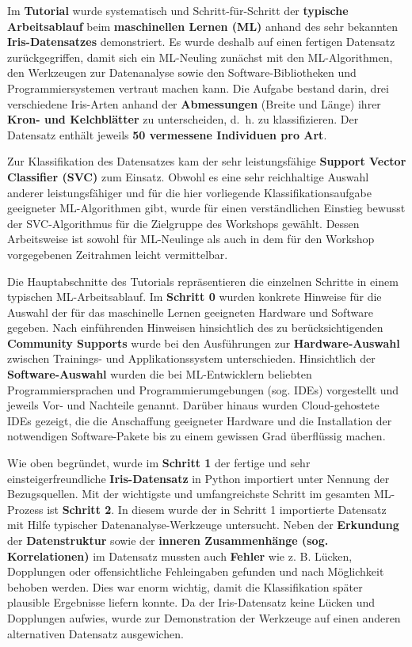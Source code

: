 \documentclass [oneside,10pt,a4paper,ngerman,BCOR10mm,headsepline,parindent,final]{scrartcl}
\begin{document}
Im \textbf{Tutorial} wurde systematisch und Schritt-für-Schritt der
\textbf{typische Arbeitsablauf} beim \textbf{maschinellen Lernen (ML)}
anhand des sehr bekannten \textbf{Iris-Datensatzes} demonstriert. Es
wurde deshalb auf einen fertigen Datensatz zurückgegriffen, damit sich
ein ML-Neuling zunächst mit den ML-Algorithmen, den Werkzeugen zur
Datenanalyse sowie den Software-Bibliotheken und Programmiersystemen
vertraut machen kann. Die Aufgabe bestand darin, drei verschiedene
Iris-Arten anhand der \textbf{Abmessungen} (Breite und Länge) ihrer
\textbf{Kron- und Kelchblätter} zu unterscheiden, d.~h. zu
klassifizieren. Der Datensatz enthält jeweils \textbf{50 vermessene
Individuen pro Art}.

Zur Klassifikation des Datensatzes kam der sehr leistungsfähige
\textbf{Support Vector Classifier (SVC)} zum Einsatz. Obwohl es eine
sehr reichhaltige Auswahl anderer leistungsfähiger und für die hier
vorliegende Klassifikationsaufgabe geeigneter ML-Algorithmen gibt, wurde
für einen verständlichen Einstieg bewusst der SVC-Algorithmus für die
Zielgruppe des Workshops gewählt. Dessen Arbeitsweise ist sowohl für
ML-Neulinge als auch in dem für den Workshop vorgegebenen Zeitrahmen
leicht vermittelbar.

Die Hauptabschnitte des Tutorials repräsentieren die einzelnen Schritte
in einem typischen ML-Arbeitsablauf. Im \textbf{Schritt 0} wurden
konkrete Hinweise für die Auswahl der für das maschinelle Lernen
geeigneten Hardware und Software gegeben. Nach einführenden Hinweisen
hinsichtlich des zu berücksichtigenden \textbf{Community Supports} wurde
bei den Ausführungen zur \textbf{Hardware-Auswahl} zwischen Trainings-
und Applikationssystem unterschieden. Hinsichtlich der
\textbf{Software-Auswahl} wurden die bei ML-Entwicklern beliebten
Programmiersprachen und Programmierumgebungen (sog. IDEs) vorgestellt
und jeweils Vor- und Nachteile genannt. Darüber hinaus wurden
Cloud-gehostete IDEs gezeigt, die die Anschaffung geeigneter Hardware
und die Installation der notwendigen Software-Pakete bis zu einem
gewissen Grad überflüssig machen.

Wie oben begründet, wurde im \textbf{Schritt 1} der fertige und sehr
einsteigerfreundliche \textbf{Iris-Datensatz} in Python importiert unter
Nennung der Bezugsquellen. Mit der wichtigste und umfangreichste Schritt
im gesamten ML-Prozess ist \textbf{Schritt 2}. In diesem wurde der in
Schritt 1 importierte Datensatz mit Hilfe typischer
Datenanalyse-Werkzeuge untersucht. Neben der \textbf{Erkundung} der
\textbf{Datenstruktur} sowie der \textbf{inneren Zusammenhänge (sog.
Korrelationen)} im Datensatz mussten auch \textbf{Fehler} wie z. B.
Lücken, Dopplungen oder offensichtliche Fehleingaben gefunden und nach
Möglichkeit behoben werden. Dies war enorm wichtig, damit die
Klassifikation später plausible Ergebnisse liefern konnte. Da der
Iris-Datensatz keine Lücken und Dopplungen aufwies, wurde zur
Demonstration der Werkzeuge auf einen anderen alternativen Datensatz
ausgewichen.
\end{document}
